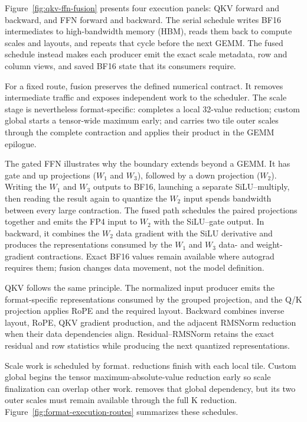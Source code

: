 Figure~\ref{fig:qkv-ffn-fusion} presents four execution panels:
QKV forward and backward, and FFN forward and backward. The serial schedule
writes BF16 intermediates to high-bandwidth
memory (HBM), reads them back to compute scales and layouts, and repeats that
cycle before the next GEMM. The fused schedule instead makes each producer
emit the exact scale metadata, row and column views, and saved BF16 state that
its consumers require.

For a fixed route, fusion preserves the defined numerical contract. It removes
intermediate traffic and exposes independent work to the scheduler. The scale stage is nevertheless
format-specific: \mxfp{} completes a local 32-value reduction; custom global
\nvfp{} starts a tensor-wide maximum early; and \localcta{} carries two tile
outer scales through the complete contraction and applies their product in the
GEMM epilogue.

The gated FFN illustrates why the boundary extends beyond a GEMM. It has gate
and up projections ($W_1$ and $W_3$), followed by a down projection ($W_2$).
Writing the $W_1$ and $W_3$ outputs to BF16, launching a separate
SiLU--multiply, then reading the result again to quantize the $W_2$ input
spends bandwidth between every large contraction. The fused path schedules the
paired projections together and emits the FP4 input to $W_2$ with the
SiLU--gate output. In backward, it combines the $W_2$ data gradient with the
SiLU derivative and produces the representations consumed by the $W_1$ and
$W_3$ data- and weight-gradient contractions. Exact BF16 values remain
available where autograd
requires them; fusion changes data movement, not the model definition.

QKV follows the same principle. The normalized input producer emits the
format-specific representations consumed by the grouped projection, and the
Q/K projection applies RoPE and the required layout. Backward combines inverse
layout, RoPE, QKV gradient production, and the adjacent RMSNorm reduction when
their data dependencies align. Residual--RMSNorm retains the exact residual
and row statistics while producing the next quantized representations.

Scale work is scheduled by format. \mxfp{} reductions finish with each local
tile. Custom global \nvfp{} begins the tensor maximum-absolute-value reduction
early so scale finalization can
overlap other work. \localcta{} removes that global dependency, but its two
outer scales must remain available through the full K reduction.
Figure~\ref{fig:format-execution-routes} summarizes these schedules.

